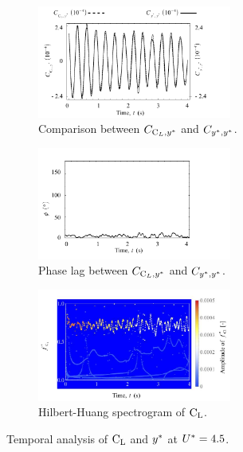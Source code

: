 \documentclass[oneside]{utmthesis}
\begin{document}
\begin{figure}[H]
  \centering
  \begin{subfigure}[h]{1\textwidth}
  \hspace{2.4cm}
    \includegraphics[width=0.7\textwidth]{figs/tempAnalysisKVIV-a}
    \caption{Comparison between $C_{\text{C}_{L},y^{*}}$ and $C_{y^{*},y^{*}}$.}
    \label{fig:tempAnalysisKVIV-a}
  \end{subfigure}

  \begin{subfigure}[h]{1\textwidth}
  \hspace{2.4cm}
    \includegraphics[width=0.7\textwidth]{figs/tempAnalysisKVIV-b}
    \caption{Phase lag between $C_{\text{C}_{L},y^{*}}$ and $C_{y^{*},y^{*}}$.}
    \label{fig:tempAnalysisKVIV-b}
  \end{subfigure}

  \begin{subfigure}[h]{1\textwidth}
  \hspace{2.4cm}
    \includegraphics[width=0.7\textwidth]{figs/tempAnalysisKVIV-c}
    \caption{Hilbert-Huang spectrogram of $\text{C}_{\text{L}}$.}
    \label{fig:tempAnalysisKVIV-c}
  \end{subfigure}

  \caption{Temporal analysis of $\text{C}_{\text{L}}$ and $y^{*}$ at $U^{*} = 4.5$.} \label{fig:tempAnalysisKVIV}
\end{figure}
\end{document}
